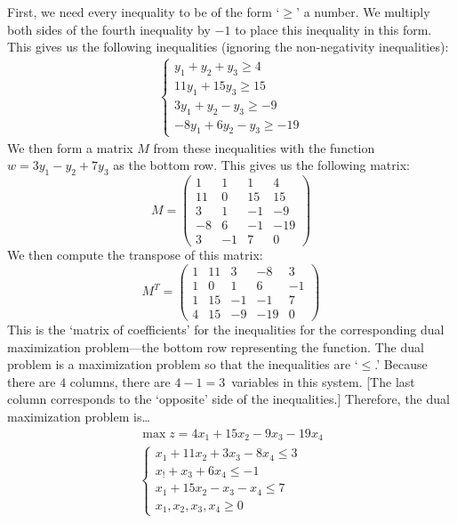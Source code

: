 \documentclass[12pt,letterpaper]{exam}
\begin{document}
\begin{questions}
First, we need every inequality to be of the form `$\geq$' a number. We multiply both sides of the fourth inequality by $-1$ to place this inequality in this form. This gives us the following inequalities (ignoring the non-negativity inequalities):
	\[
	\begin{gathered}
	\begin{cases}
	y_1 + y_2 + y_3 \geq 4 \\
	11y_1 + 15y_3 \geq 15 \\
	3y_1 + y_2 - y_3 \geq -9 \\
	-8y_1 + 6y_2 - y_3 \geq -19 	
	\end{cases}
	\end{gathered}
	\]
We then form a matrix $M$ from these inequalities with the function $w= 3y_1 - y_2 + 7y_3$ as the bottom row. This gives us the following matrix: 
	\[
	M=
	\begin{pmatrix}
	1 & 1 & 1 & 4 \\
	11 & 0 & 15 & 15 \\
	3 & 1 & -1 & -9 \\
	-8 & 6 & -1 & -19 \\
	3 & -1 & 7 & 0 
	\end{pmatrix}
	\]
We then compute the transpose of this matrix:
	\[
	M^T= 
	\begin{pmatrix}
	1 & 11 & 3 & -8 & 3 \\
	1 & 0 & 1 & 6 & -1 \\
	1 & 15 & -1 & -1 & 7 \\
	4 & 15 & -9 & -19 & 0 
	\end{pmatrix}
	\]
This is the `matrix of coefficients' for the inequalities for the corresponding dual maximization problem---the bottom row representing the function. The dual problem is a maximization problem so that the inequalities are `$\leq$.' Because there are $4$ columns, there are $4 - 1= 3$~variables in this system. [The last column corresponds to the `opposite' side of the inequalities.] Therefore, the dual maximization problem is\dots
	\[
	\begin{gathered}
	\max z= 4x_1 +15x_2 - 9x_3 - 19x_4 \\
	\begin{cases}
	x_1 + 11x_2 + 3x_3 - 8x_4 \leq 3 \\
	x_! + x_3 + 6x_4 \leq -1 \\
	x_1 + 15x_2 - x_3 - x_4 \leq 7 \\
	x_1, x_2, x_3, x_4 \geq 0
	\end{cases}
	\end{gathered}
	\] 




\end{questions}
\end{document}
